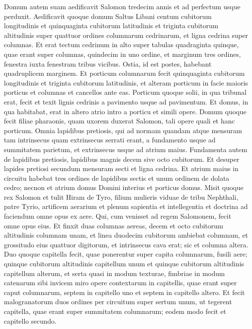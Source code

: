 \begin{biblechapter}
\begin{biblechapter}
\begin{biblechapter}
\begin{biblechapter}
\begin{biblechapter}
\begin{biblechapter}
\begin{biblechapter}
\verse Domum autem suam aedificavit Salomon tredecim annis et ad perfectum usque perduxit. 
\verse Aedificavit quoque domum Saltus Libani centum cubitorum longitudinis et quinquaginta cubitorum latitudinis et triginta cubitorum altitudinis super quattuor ordines columnarum cedrinarum, et ligna cedrina super columnas. 
\verse Et erat tectum cedrinum in alto super tabulas quadraginta quinque, quae erant super columnas, quindecim in uno ordine, 
\verse et marginum tres ordines, fenestra iuxta fenestram tribus vicibus. 
\verse Ostia, id est postes, habebant quadruplicem marginem. 
\verse Et porticum columnarum fecit quinquaginta cubitorum longitudinis et triginta cubitorum latitudinis, et alteram porticum in facie maioris porticus et columnas et cancellos ante eas. 
 \verse Porticum quoque solii, in qua tribunal erat, fecit et texit lignis cedrinis a pavimento usque ad pavimentum. 
\verse Et domus, in qua habitabat, erat in altero atrio intro a porticu et simili opere. Domum quoque fecit filiae pharaonis, quam uxorem duxerat Salomon, tali opere quali et hanc porticum.
 \verse Omnia lapidibus pretiosis, qui ad normam quandam atque mensuram tam intrinsecus quam extrinsecus serrati erant, a fundamento usque ad summitatem parietum, et extrinsecus usque ad atrium maius. 
\verse Fundamenta autem de lapidibus pretiosis, lapidibus magnis decem sive octo cubitorum. 
\verse Et desuper lapides pretiosi secundum mensuram secti et ligna cedrina. 
\verse Et atrium maius in circuitu habebat tres ordines de lapidibus sectis et unum ordinem de dolata cedro; necnon et atrium domus Domini interius et porticus domus.
 \verse Misit quoque rex Salomon et tulit Hiram de Tyro, 
\verse filium mulieris viduae de tribu Nephthali, patre Tyrio, artificem aerarium et plenum sapientia et intellegentia et doctrina ad faciendum omne opus ex aere. Qui, cum venisset ad regem Salomonem, fecit omne opus eius.
 \verse Et finxit duas columnas aereas, decem et octo cubitorum altitudinis columnam unam, et linea duodecim cubitorum ambiebat columnam, et grossitudo eius quattuor digitorum, et intrinsecus cava erat; sic et columna altera. 
\verse Duo quoque capitella fecit, quae ponerentur super capita columnarum, fusili aere; quinque cubitorum altitudinis capitellum unum et quinque cubitorum altitudinis capitellum alterum, 
\verse et serta quasi in modum texturae, fimbriae in modum catenarum sibi invicem miro opere contextarum in capitellis, quae erant super caput columnarum, septem in capitello uno et septem in capitello altero. 
\verse Et fecit malogranatorum duos ordines per circuitum super sertum unum, ut tegerent capitella, quae erant super summitatem columnarum; eodem modo fecit et capitello secundo. 

\end{biblechapter}
\end{biblechapter}
\end{biblechapter}
\end{biblechapter}
\end{biblechapter}
\end{biblechapter}
\end{biblechapter}
